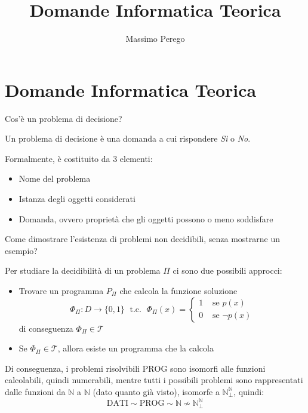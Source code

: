 \documentclass[12pt, answers]{exam}
\title{Domande Informatica Teorica}
\author{Massimo Perego}
\date{}
\theoremstyle{plain}
\newcommand{\tc}{\; \text{ t.c. } \;}
\newcommand{\dati}{\text{DATI}}
\newcommand{\prog}{\text{PROG}}
\newcommand{\T}{\mathcal{T}}
\newcommand{\N}{\mathbb{N}}
\begin{document}
    
    \section*{Domande Informatica Teorica}
    
    \begin{questions}
        \question Cos'è un problema di decisione?
        
        \begin{solution}
            Un problema di decisione è una domanda a cui rispondere \textit{Sì} o \textit{No}. 
            
            Formalmente, è costituito da 3 elementi:
            \begin{itemize}
                \item Nome del problema
                
                \item Istanza degli oggetti considerati
                
                \item Domanda, ovvero proprietà che gli oggetti possono o meno soddisfare
            \end{itemize}
        \end{solution}
        
        \item Come dimostrare l'esistenza di problemi non decidibili, senza mostrarne un esempio?
        
        \begin{solution}
            Per studiare la decidibilità di un problema $\Pi$ ci sono due possibili approcci:
            \begin{itemize}
                \item Trovare un programma $P_\Pi$ che calcola la funzione soluzione
                $$ \Phi_\Pi : D \rightarrow \{0,1\} \tc \Phi_\Pi (x) = \begin{cases}
                    1 & \text{ se } p(x) \\
                    0 & \text{ se } \neg p(x)
                \end{cases}$$
                di conseguenza $\Phi_\Pi \in \T$
                
                \item Se $\Phi_\Pi \in \T$, allora esiste un programma che la calcola
            \end{itemize}
            
            Di conseguenza, i problemi risolvibili $\prog$ sono isomorfi alle funzioni calcolabili, quindi numerabili, mentre tutti i possibili problemi sono rappresentati dalle funzioni da $\N$ a $\N$ (dato quanto già visto), isomorfe a $\N_\bot^\N$, quindi:
            $$ \dati \sim \prog \sim \N \nsim \N_\bot^\N $$
            

\end{solution}
\end{questions}
\end{document}
